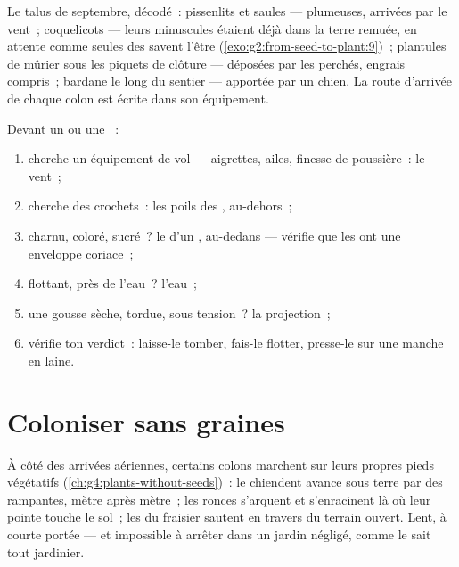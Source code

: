 \begin{example}\label{ex:g6:how-plants-spread:roadside}
Le talus de septembre, décodé~: pissenlits et saules --- 
plumeuses, arrivées par le vent~; coquelicots --- leurs minuscules
 étaient déjà dans la terre remuée, en attente comme seules
des  savent l'être (\cref{exo:g2:from-seed-to-plant:9})~;
plantules de mûrier sous les piquets de clôture --- déposées par les
 perchés, engrais compris~; bardane le long du sentier ---
apportée par un chien. La route d'arrivée de chaque colon est écrite
dans son équipement.
\end{example}

\begin{method}\label{met:g6:how-plants-spread:name}
Devant un  ou une ~:
\begin{enumerate}
  \item cherche un équipement de vol --- aigrettes, ailes, finesse
        de poussière~: le vent~;
  \item cherche des crochets~: les poils des , au-dehors~;
  \item charnu, coloré, sucré~? le  d'un , au-dedans
        --- vérifie que les  ont une enveloppe coriace~;
  \item flottant, près de l'eau~? l'eau~;
  \item une gousse sèche, tordue, sous tension~? la projection~;
  \item vérifie ton verdict~: laisse-le tomber, fais-le flotter,
        presse-le sur une manche en laine.
\end{enumerate}
\end{method}

\section{Coloniser sans graines}

\begin{example}\label{ex:g6:how-plants-spread:vegetative}
À côté des arrivées aériennes, certains colons marchent sur leurs
propres pieds végétatifs
(\cref{ch:g4:plants-without-seeds})~: le chiendent avance sous terre
par des  rampantes, mètre après mètre~; les ronces s'arquent et
s'enracinent là où leur pointe touche le sol~; les  du
fraisier sautent en travers du terrain ouvert. Lent, à courte
portée --- et impossible à arrêter dans un jardin négligé, comme le
sait tout jardinier.
\end{example}

